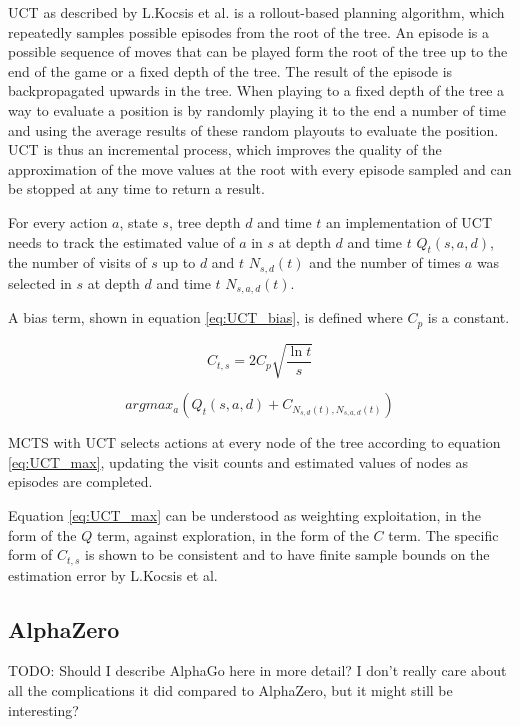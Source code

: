\documentclass[12pt,onecolumn,oneside,titlepage]{article}
\begin{document}
UCT as described by L.Kocsis et al. is a rollout-based planning algorithm, which repeatedly samples possible episodes from the root of the tree. An episode is a possible sequence of moves that can be played form the root of the tree up to the end of the game or a fixed depth of the tree. The result
of the episode is backpropagated upwards in the tree. When playing to a fixed depth of the tree a way to evaluate a position is by randomly playing it to the end a number of time and using the average results of these random playouts to evaluate the position.
UCT is thus an incremental process, which improves the quality of the approximation of the move values at the root with every episode sampled and can be stopped at any time to return a result.

For every action $a$, state $s$, tree depth $d$ and time $t$ an implementation of UCT needs to track the estimated value of $a$ in $s$ at depth $d$ and time $t$ $Q_t(s,a,d)$, the number of visits of $s$ up to $d$ and $t$ $N_{s,d}(t)$ and the number of times
$a$ was selected in $s$ at depth $d$ and time $t$ $N_{s,a,d}(t)$.

A bias term, shown in equation \ref{eq:UCT_bias}, is defined where $C_p$ is a constant.

\begin{equation}
 C_{t,s} = 2C_p \sqrt{\frac{\ln t}{s}}\label{eq:UCT_bias}
\end{equation}


\begin{equation}
 argmax_a(Q_t(s,a,d) + C_{N_{s,d}(t), N_{s,a,d}(t)}\label{eq:UCT_max})
\end{equation}

MCTS with UCT selects actions at every node of the tree according to equation \ref{eq:UCT_max}, updating the visit counts and estimated values of nodes as episodes are completed.

Equation \ref{eq:UCT_max} can be understood as weighting exploitation, in the form of the $Q$ term, against exploration, in the form of the $C$ term. The specific form of $C_{t,s}$ is shown to be consistent and to have finite sample bounds on the estimation error by L.Kocsis et al.


\subsection{AlphaZero}

TODO: Should I describe AlphaGo here in more detail? I don't really care about all the complications it did compared to AlphaZero, but it might still be interesting?
\end{document}
